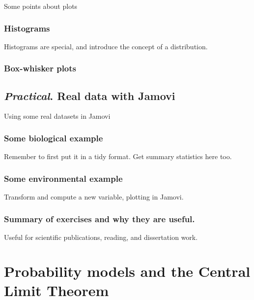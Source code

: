 \documentclass[
]{book}
\begin{document}
Some points about plots

\hypertarget{histograms}{%
\section{Histograms}\label{histograms}}

Histograms are special, and introduce the concept of a distribution.

\hypertarget{box-whisker-plots}{%
\section{Box-whisker plots}\label{box-whisker-plots}}

\hypertarget{practical.-real-data-with-jamovi}{%
\chapter{\texorpdfstring{\emph{Practical}. Real data with Jamovi}{Practical. Real data with Jamovi}}\label{practical.-real-data-with-jamovi}}

Using some real datasets in Jamovi

\hypertarget{some-biological-example}{%
\section{Some biological example}\label{some-biological-example}}

Remember to first put it in a tidy format. Get summary statistics here too.

\hypertarget{some-environmental-example}{%
\section{Some environmental example}\label{some-environmental-example}}

Transform and compute a new variable, plotting in Jamovi.

\hypertarget{summary-of-exercises-and-why-they-are-useful.-1}{%
\section{Summary of exercises and why they are useful.}\label{summary-of-exercises-and-why-they-are-useful.-1}}

Useful for scientific publications, reading, and dissertation work.

\hypertarget{part-probability-models-and-the-central-limit-theorem}{%
\part{Probability models and the Central Limit Theorem}\label{part-probability-models-and-the-central-limit-theorem}}
\end{document}
